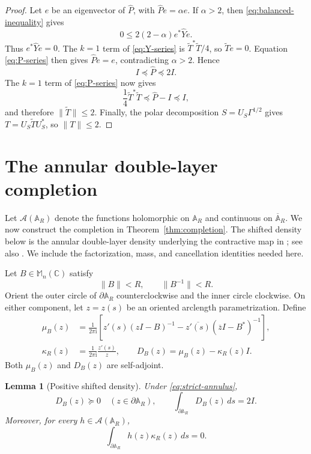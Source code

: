 \documentclass[preprints,article,submit,oneauthor]{Definitions/mdpi}
\newcounter{manuscriptresult}[section]
\theoremstyle{mdpi}
\newtheorem{lemma}[manuscriptresult]{Lemma}
\theoremstyle{definition}
\newcommand{\C}{\mathbb C}
\newcommand{\Mn}{\mathbb M_n(\C)}
\newcommand{\iu}{\mathrm{i}}
\begin{document}
\begin{proof}
Let $e$ be an eigenvector of $\widehat P$, with
$\widehat Pe=\alpha e$.  If $\alpha>2$, then
\eqref{eq:balanced-inequality} gives
\[
  0\leq2(2-\alpha)e^*\widehat Ye.
\]
Thus $e^*\widehat Ye=0$.  The $k=1$ term of
\eqref{eq:Y-series} is $\widetilde T^*\widetilde T/4$, so
$\widetilde Te=0$.  Equation
\eqref{eq:P-series} then gives $\widehat Pe=e$, contradicting
$\alpha>2$.  Hence
\begin{equation}
  I\preceq\widehat P\preceq2I.
  \label{eq:P-bounds}
\end{equation}
The $k=1$ term of \eqref{eq:P-series} now gives
\[
  \frac14\widetilde T^*\widetilde T\preceq\widehat P-I\preceq I,
\]
and therefore $\lVert\widetilde T\rVert\leq2$.  Finally, the polar
decomposition $S=U_S\Gamma^{1/2}$ gives
$T=U_S\widetilde TU_S^*$, so
$\lVert T\rVert\leq2$.
\end{proof}

\section{The annular double-layer completion}
\label{sec:annular-completion}

Let $\mathcal A(\mathbb A_R)$ denote the functions holomorphic on
$\mathbb A_R$ and continuous on $\overline{\mathbb A}_R$.  We now
construct the completion in Theorem~\ref{thm:completion}.  The shifted
density below is the annular double-layer density underlying the
contractive map in \cite[Section~5]{CrouzeixGreenbaum2019}; see also
\cite[Theorem~3.12]{JuryTsikalas2024}.  We include the factorization,
mass, and cancellation identities needed here.

Let $B\in\Mn$ satisfy
\begin{equation}
  \lVert B\rVert<R,
  \qquad
  \lVert B^{-1}\rVert<R.
  \label{eq:strict-annulus}
\end{equation}
Orient the outer circle of $\partial\mathbb A_R$ counterclockwise and
the inner circle clockwise.  On either component, let $z=z(s)$ be an
oriented arclength parametrization.  Define
\begin{align}
  \mu_B(z)
  &=\frac1{2\pi\iu}\left[
  z'(s)(zI-B)^{-1}
  -\overline{z'(s)}(\overline zI-B^*)^{-1}\right],
  \label{eq:mu-density}\\
  \kappa_R(z)
  &=\frac1{2\pi\iu}\frac{z'(s)}z,
  \qquad
  D_B(z)=\mu_B(z)-\kappa_R(z)I.
  \label{eq:shifted-density}
\end{align}
Both $\mu_B(z)$ and $D_B(z)$ are self-adjoint.

\begin{lemma}[Positive shifted density]
\label{lem:positive-density}
Under \eqref{eq:strict-annulus},
\begin{equation}
  D_B(z)\succeq0
  \quad(z\in\partial\mathbb A_R),
  \qquad
  \int_{\partial\mathbb A_R}D_B(z)\,ds=2I.
  \label{eq:density-positive-mass}
\end{equation}
Moreover, for every $h\in\mathcal A(\mathbb A_R)$,
\begin{equation}
  \int_{\partial\mathbb A_R}
  h(z)\kappa_R(z)\,ds=0.
  \label{eq:kappa-cancellation}
\end{equation}
\end{lemma}
\end{document}
